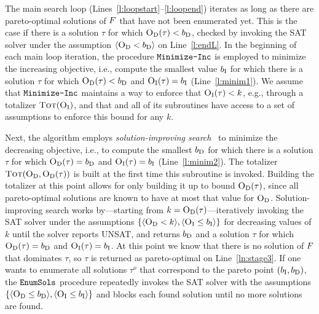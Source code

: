 The main search loop (Lines~\ref{l:loopstart}--\ref{l:loopend}) iterates as long as there are pareto-optimal solutions of $F$ that have not been enumerated yet. 
This is the case if there is a solution $\tau$ for which $\textsc{O}_{\text{D}}(\tau) < b_{\text{D}}$,  checked by invoking the SAT solver under the assumption 
$\langle \textsc{O}_{\text{D}} < b_{\text{D}} \rangle$ on Line~\ref{l:endL}.
In the beginning of each main loop iteration, the procedure $\texttt{Minimize-\allowbreak{}Inc}$ is employed to minimize the increasing objective, i.e.,
compute the smallest value $b_{\text{I}}$ for which there is a solution $\tau$ for which $\textsc{O}_{\text{D}}(\tau) < b_{\text{D}}$ and 
$\textsc{O}_{\text{I}}(\tau) = b_{\text{I}}$  (Line~\ref{l:minim1}). 
We assume that $\texttt{Minimize-\allowbreak{}Inc}$ maintains a way to enforce that $\textsc{O}_{\text{I}}(\tau) < k$, e.g., through a totalizer $\textsc{Tot}(\textsc{O}_{\text{I}})$, and that
\algname{} and all of its subroutines have access to a set of assumptions to enforce this bound for any $k$.

Next, the algorithm employs \emph{solution-improving search}~\autocite{handbook2-maxsat,DBLP:journals/jsat/BerreP10,DBLP:journals/jsat/EenS06}
to minimize the decreasing objective, i.e., to compute the smallest 
$b_{\text{D}}$ for which there is a solution $\tau$ for which $\textsc{O}_{\text{D}}(\tau) = b_{\text{D}}$ and $\textsc{O}_{\text{I}}(\tau) = b_{\text{I}}$  (Line~\ref{l:minim2}).
The totalizer $\textsc{Tot}(\textsc{O}_{\text{D}}, \textsc{O}_{\text{D}}(\tau))$ is built at the first time this subroutine is invoked.
Building the totalizer at this point allows for only building it up to bound $\textsc{O}_{\text{D}}(\tau)$, since all pareto-optimal solutions are known to have at most that value for $\textsc{O}_{\text{D}}$.
Solution-improving search works by---starting from $k=\textsc{O}_{\text{D}}(\tau)$---iteratively invoking the SAT solver under the assumptions $\{\langle \textsc{O}_{\text{D}} < k \rangle, \langle \textsc{O}_{\text{I}} \leq b_{\text{I}} \rangle\}$
for decreasing values of $k$ until the solver reports UNSAT, and
returns $b_{\text{D}}$ and a solution $\tau$ for which $\textsc{O}_{\text{D}}(\tau) = b_{\text{D}}$ and $\textsc{O}_{\text{I}}(\tau) = b_{\text{I}}$.
At this point we know that there is no solution of $F$ that dominates $\tau$, so
$\tau$ is  returned as pareto-optimal on Line~\ref{ln:stage3}.
If one wants to enumerate all
solutions $\tau^o$ that correspond to the pareto point $(b_{\text{I}},b_{\text{D}})$,
the $\texttt{EnumSols}$ procedure  repeatedly invokes the SAT solver with the assumptions $\{\langle \textsc{O}_{\text{D}} \leq b_{\text{D}} \rangle , \langle \textsc{O}_{\text{I}} \leq b_{\text{I}} \rangle\}$ and blocks each found solution
until no more solutions are found.

